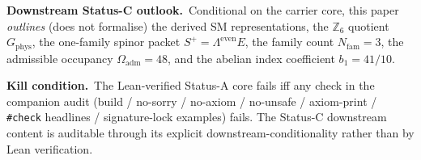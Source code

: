 \documentclass[11pt,a4paper]{article}
\begin{document}
\begin{tfptclaimcontract}
\smallskip
\textbf{Downstream Status-C outlook.}\ Conditional on the carrier core, this paper \emph{outlines}
(does not formalise) the derived SM representations, the $\mathbb Z_6$ quotient
$G_{\mathrm{phys}}$, the one-family spinor packet $S^+ = \Lambda^{\mathrm{even}} E$, the family
count $N_{\mathrm{fam}} = 3$, the admissible occupancy $\Omega_{\mathrm{adm}} = 48$, and the
abelian index coefficient $b_1 = 41/10$.

\smallskip
\textbf{Kill condition.}\ The Lean-verified Status-A core fails iff any check in the companion
audit (build / no-sorry / no-axiom / no-unsafe / axiom-print / \texttt{\#check} headlines /
signature-lock examples) fails. The Status-C downstream content is auditable through its
explicit downstream-conditionality rather than by Lean verification.
\end{tfptclaimcontract}
\end{document}
